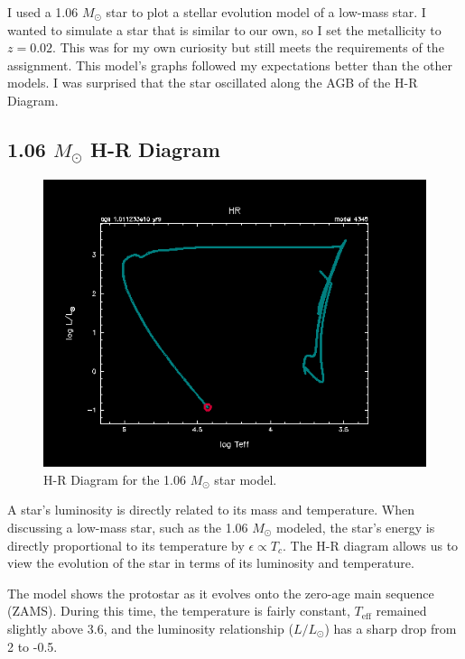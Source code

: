\documentclass[fleqn,usenatbib]{mnras}
\begin{document}
I used a 1.06 \(M_\odot\) star to plot a stellar evolution model of a low-mass star. I wanted to simulate a star that is similar to our own, so I set the metallicity to $z=0.02$. This was for my own curiosity but still meets the requirements of the assignment. This model's graphs followed my expectations better than the other models. I was surprised that the star oscillated along the AGB of the H-R Diagram.

\subsection{1.06 \(M_\odot\) H-R Diagram}

\begin{figure}
	\includegraphics[width=\columnwidth]{1.06_hr_profile.png}
    \caption{H-R Diagram for the 1.06 \(M_\odot\) star model.}
    \label{fig:1.06_Msun_HR_figure}
\end{figure}

A star's luminosity is directly related to its mass and temperature. When discussing a low-mass star, such as the 1.06 \(M_\odot\) modeled, the star's energy is directly proportional to its temperature by $\epsilon \propto T_c$. The H-R diagram allows us to view the evolution of the star in terms of its luminosity and temperature.

The model shows the protostar as it evolves onto the zero-age main sequence (ZAMS). During this time, the temperature is fairly constant, $T_{\text{eff}}$ remained slightly above 3.6, and the luminosity relationship ($L/L_\odot$) has a sharp drop from 2 to -0.5. 
\end{document}
